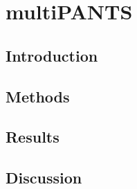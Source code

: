 %
%

\chapter{multiPANTS}

\section{Introduction}

\section{Methods}

\section{Results}

\section{Discussion}

